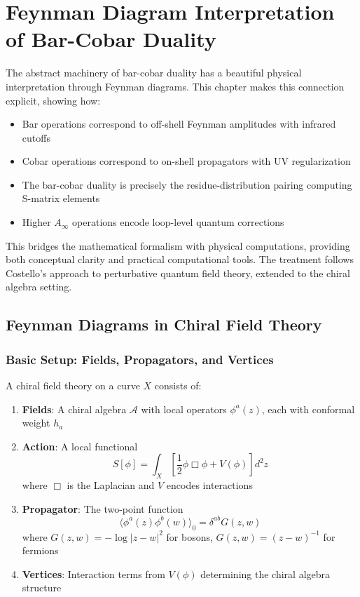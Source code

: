 \chapter{Feynman Diagram Interpretation of Bar-Cobar Duality}
\label{ch:feynman}

\begin{remark}
The abstract machinery of bar-cobar duality has a beautiful physical interpretation 
through Feynman diagrams. This chapter makes this connection explicit, showing how:
\begin{itemize}
\item Bar operations correspond to off-shell Feynman amplitudes with infrared cutoffs
\item Cobar operations correspond to on-shell propagators with UV regularization
\item The bar-cobar duality is precisely the residue-distribution pairing computing 
S-matrix elements
\item Higher $A_\infty$ operations encode loop-level quantum corrections
\end{itemize}

This bridges the mathematical formalism with physical computations, providing both 
conceptual clarity and practical computational tools. The treatment follows Costello's 
approach to perturbative quantum field theory, extended to the chiral algebra setting.
\end{remark}

\section{Feynman Diagrams in Chiral Field Theory}

\subsection{Basic Setup: Fields, Propagators, and Vertices}

\begin{definition}
A chiral field theory on a curve $X$ consists of:
\begin{enumerate}
\item \textbf{Fields}: A chiral algebra $\mathcal{A}$ with local operators 
$\phi^a(z)$, each with conformal weight $h_a$

\item \textbf{Action}: A local functional
$$S[\phi] = \int_X \left[\frac{1}{2}\phi \Box \phi + V(\phi)\right] d^2z$$
where $\Box$ is the Laplacian and $V$ encodes interactions

\item \textbf{Propagator}: The two-point function
$$\langle \phi^a(z) \phi^b(w) \rangle_0 = \delta^{ab} G(z,w)$$
where $G(z,w) = -\log|z-w|^2$ for bosons, $G(z,w) = (z-w)^{-1}$ for fermions

\item \textbf{Vertices}: Interaction terms from $V(\phi)$ determining the 
chiral algebra structure
\end{enumerate}
\end{definition}

